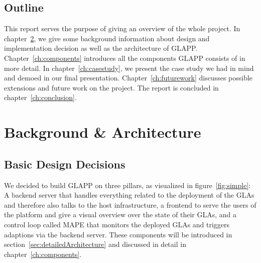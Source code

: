 \documentclass{seal_thesis}
\begin{document}
\section{Outline}
This report serves the purpose of giving an overview of the whole project.
In chapter~\ref{ch:background}, we give some background information about design and implementation decision as well as the architecture of GLAPP.
Chapter~\ref{ch:components} introduces all the components GLAPP consists of in more detail.
In chapter~\ref{ch:casestudy}, we present the case study we had in mind and demoed in our final presentation.
Chapter~\ref{ch:futurework} discusses possible extensions and future work on the project.
The report is concluded in chapter~\ref{ch:conclusion}.



\chapter{Background \& Architecture}\label{ch:background}

\section{Basic Design Decisions}

We decided to build GLAPP on three pillars, as visualized in figure~\ref{fig:simple}:
A backend server that handles everything related to the deployment of the GLAs and therefore also talks to the host infrastructure, a frontend to serve the users of the platform and give a visual overview over the state of their GLAs, and a control loop called MAPE that monitors the deployed GLAs and triggers adaptions via the backend server. These components will be introduced in section~\ref{sec:detailedArchitecture} and discussed in detail in chapter~\ref{ch:components}.
\end{document}
